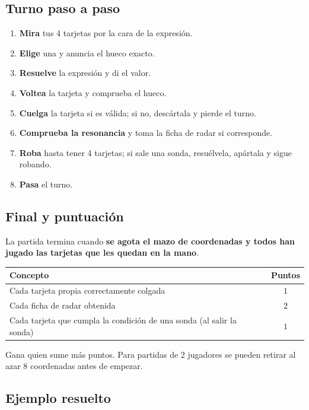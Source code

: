 \documentclass[12pt, letterpaper]{article}
\begin{document}
\subsection{Turno paso a paso}

\begin{enumerate}[leftmargin=*]
  \item \textbf{Mira} tus 4 tarjetas por la cara de la expresión.
  \item \textbf{Elige} una y anuncia el hueco exacto.
  \item \textbf{Resuelve} la expresión y di el valor.
  \item \textbf{Voltea} la tarjeta y comprueba el hueco.
  \item \textbf{Cuelga} la tarjeta si es válida; si no, descártala y pierde el turno.
  \item \textbf{Comprueba la resonancia} y toma la ficha de radar si corresponde.
  \item \textbf{Roba} hasta tener 4 tarjetas; si sale una sonda, resuélvela, apártala y sigue robando.
  \item \textbf{Pasa} el turno.
\end{enumerate}

\subsection{Final y puntuación}

La partida termina cuando \textbf{se agota el mazo de coordenadas y todos han jugado las tarjetas que les quedan en la mano}.

\begin{center}
\small
\begin{tabular}{@{}l c@{}}
\toprule
\textbf{Concepto} & \textbf{Puntos}\\
\midrule
Cada tarjeta propia correctamente colgada & $1$\\
Cada ficha de radar obtenida & $2$\\
Cada tarjeta que cumpla la condición de una sonda (al salir la sonda) & $1$\\
\bottomrule
\end{tabular}
\end{center}

Gana quien sume más puntos. Para partidas de 2 jugadores se pueden retirar al azar 8 coordenadas antes de empezar.

\subsection{Ejemplo resuelto}
\end{document}
